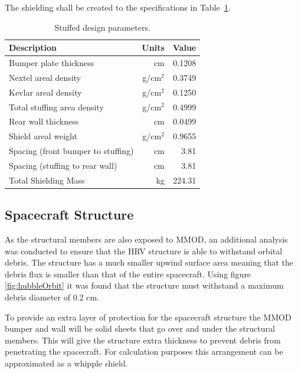 \documentclass[paper=letter, fontsize=11pt]{scrartcl} %
\numberwithin{equation}{section} %
\numberwithin{figure}{section} %
\numberwithin{table}{section} %
\begin{document}
The shielding shall be created to the specifications in Table~\ref{table:stuffedWhippleDesign}.

\begin{table}[H]
    \begin{centering}
        \begin{tabular}{lrr}
            \toprule
            Description                        & Units    & Value  \\ \hline
            \midrule
            Bumper plate thickness             & cm       & 0.1208 \\
            Nextel areal density               & g/cm$^2$ & 0.3749 \\
            Kevlar areal density               & g/cm$^2$ & 0.1250 \\
            Total stuffing area density        & g/cm$^2$ & 0.4999 \\
            Rear wall thickness                & cm       & 0.0499 \\
            Shield areal weight                & g/cm$^2$ & 0.9655 \\
            Spacing (front bumper to stuffing) & cm       & 3.81   \\
            Spacing (stuffing to rear wall)    & cm       & 3.81   \\
            Total Shielding Mass               & kg       & 224.31 \\
            \bottomrule
        \end{tabular}
        \caption{Stuffed design parameters.}
        \label{table:stuffedWhippleDesign}
    \end{centering}
\end{table}

\subsection{Spacecraft Structure}
As the structural members are also exposed to MMOD, an additional analysis was conducted to ensure that the HRV structure is able to withstand orbital debris. The structure has a much smaller upwind surface area meaning that the debris flux is smaller than that of the entire spacecraft. Using figure \ref{fig:hubbleOrbit} it was found that the structure must withstand a maximum debris diameter of 0.2 cm.

To provide an extra layer of protection for the spacecraft structure the MMOD bumper and wall will be solid sheets that go over and under the structural members. This will give the structure extra thickness to prevent debris from penetrating the spacecraft. For calculation purposes this arrangement can be approximated as a whipple shield.
\end{document}
